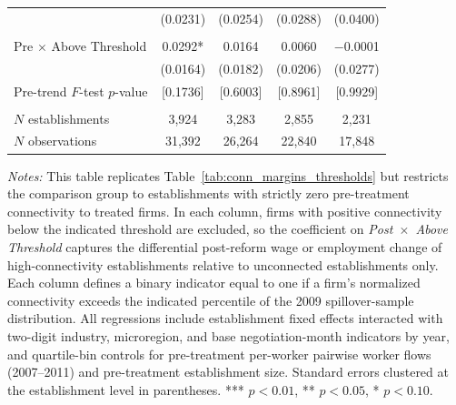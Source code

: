 \begin{table}[!htbp]
\begin{tabular}{lcccc}
  & (0.0231) & (0.0254) & (0.0288) & (0.0400) \\
  & & & & \\
Pre $\times$ Above Threshold & 0.0292* & 0.0164 & 0.0060 & $-$0.0001 \\
  & (0.0164) & (0.0182) & (0.0206) & (0.0277) \\
Pre-trend $F$-test $p$-value & [0.1736] & [0.6003] & [0.8961] & [0.9929] \\
  & & & & \\
$N$ establishments & 3,924 & 3,283 & 2,855 & 2,231 \\
$N$ observations & 31,392 & 26,264 & 22,840 & 17,848 \\
\bottomrule\bottomrule
\end{tabular}
\begin{minipage}{\linewidth}
\footnotesize\vspace{4pt}
\textit{Notes:} This table replicates Table~\ref{tab:conn_margins_thresholds} but restricts the comparison group to establishments with strictly zero pre-treatment connectivity to treated firms. In each column, firms with positive connectivity below the indicated threshold are excluded, so the coefficient on \textit{Post~$\times$~Above Threshold} captures the differential post-reform wage or employment change of high-connectivity establishments relative to unconnected establishments only. Each column defines a binary indicator equal to one if a firm's normalized connectivity exceeds the indicated percentile of the 2009 spillover-sample distribution. All regressions include establishment fixed effects interacted with two-digit industry, microregion, and base negotiation-month indicators by year, and quartile-bin controls for pre-treatment per-worker pairwise worker flows (2007--2011) and pre-treatment establishment size. Standard errors clustered at the establishment level in parentheses. *** $p<0.01$, ** $p<0.05$, * $p<0.10$.
\end{minipage}
\end{table}
